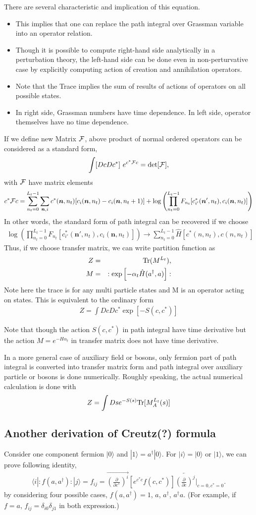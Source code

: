 \documentclass[10pt]{book}
\def\bm{\boldsymbol}
\newcommand{\bea}{\begin{eqnarray}}
\newcommand{\eea}{\end{eqnarray}}
\newcommand{\no}{\nonumber \\}
\newcommand{\del}{\partial}
\def\vn{{\bm n}}
\def\la{\langle}
\def\ra{\rangle}
\begin{document}
There are several characteristic and implication of this equation.
\begin{itemize}
	\item This implies that one can replace the path integral over Grassman variable
	      into an operator relation. 
	\item Though it is possible to compute right-hand side  analytically in a perturbation theory,
	      the left-hand side can be done even in non-perturvative case
	      by explicitly computing action of creation and annihilation operators.
	\item Note that the Trace implies 
	the sum of results of actions of operators on all possible states.
	\item In right side, Grassman numbers have time dependence. In left side, operator themselves
	have no time dependence.	
\end{itemize}




If we define new Matrix ${\cal F}$, above product of normal ordered operators can be considered as
a standard form,
\bea 
\int [Dc Dc^*]\ e^{c^* {\cal F} c}=\det[{\cal F}],
\eea  
with ${\cal F}$ have matrix elements
\bea 
c^* {\cal F} c= \sum_{n_t=0}^{L_t-1} \sum_{\vn, i}
    c^*(\vn,n_t)[c_i(\vn,n_t)-c_i(\vn,n_t+1)]+\log\left(  
    \prod_{n_t=0}^{L_t-1} F_{n_t}[c^*_{i'}(\vn',n_t),c_i(\vn,n_t)]\right)
\eea 
In other words, the standard form of path integral can be recovered if we choose
\bea 
\log\left(  
\prod_{n_t=0}^{L_t-1} F_{n_t}[c^*_{i'}(\vn',n_t),c_i(\vn,n_t)]\right)
\to \sum_{n_t=0}^{L_t-1} \hat{H}[c^*(n,n_t),c(n,n_t)]
\eea 
Thus, if we choose transfer matrix, we can write partition function as
\bea 
Z&=&{\rm Tr}(M^{L_t}) ,\no 
M&=& :\exp\left[-\alpha_t \hat{H}(a^\dagger,a)\right]: 
\eea 
Note here the trace is for any multi particle states and M is an operator acting on states.
This is equivalent to the ordinary form
\bea 
Z=\int D c Dc^* \exp[-S(c,c^*)]
\eea 

Note that though the action $S(c,c^*)$ in path integral have time derivative 
but the action $M=e^{-H\alpha_t}$ in transfer matrix does not have time derivative.

In a more general case of auxiliary field or bosons, only fermion part of path integral is
converted into transfer matrix form and path integral over auxiliary particle or bosons
is done numerically. Roughly speaking, the actual numerical calculation is done with 
\bea 
Z=\int Ds e^{-S(s)}{\rm Tr}[M^{L_t}_A(s)]
\eea  


\subsection{Another derivation of Creutz(?) formula }
Consider one component fermion $|0\ra$ and $|1\ra=a^\dagger|0\ra$.
For $|i\ra=|0\ra$ or $|1\ra$,
we can prove following identity,
\bea 
\la i|:f(a,a^\dagger):|j\ra = f_{ij} =\overrightarrow{ \left(\frac{\del}{\del c^*}\right)^i}
                   \left[ e^{c^* c} f(c,c^*) \right] \overleftarrow{ \left(\frac{\del}{\del c}\right)^j}
                   \Big|_{c=0,c^*=0}.
\eea 
by considering four possible cases, $f(a,a^\dagger)=1$, $a$, $a^\dagger$, $a^\dagger a$. 
(For example, if $f=a$, $f_{ij}=\delta_{i0}\delta_{j1}$ in both expression.)
\end{document}
